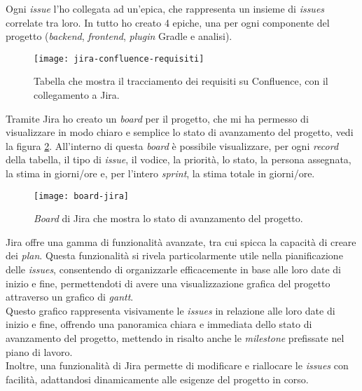 Ogni \textit{issue} l'ho collegata ad un'epica, che rappresenta un insieme di \textit{issues} correlate tra loro. In tutto ho creato 4 epiche,
una per ogni componente del progetto (\textit{backend}, \textit{frontend}, \textit{plugin} Gradle e analisi).\\
\begin{figure}[!h] 
  \centering 
  \texttt{[image: jira-confluence-requisiti]} 
  \caption{Tabella che mostra il tracciamento dei requisiti su Confluence, con il collegamento a Jira.}
  \label{fig:jira-confluence-requisiti}
\end{figure}

Tramite Jira ho creato un \textit{board} per il progetto, che mi ha permesso di visualizzare in modo chiaro e 
semplice lo stato di avanzamento del progetto, vedi la figura \ref*{fig:board-jira}.
All'interno di questa \textit{board} è possibile visualizzare, per ogni \textit{record} della tabella, il tipo di \textit{issue}, il vodice, la priorità, lo stato,
la persona assegnata, la stima in giorni/ore e, per l'intero \textit{sprint}, la stima totale in giorni/ore.\\


\begin{figure}[!h] 
  \centering 
  \texttt{[image: board-jira]} 
  \caption{\textit{Board} di Jira che mostra lo stato di avanzamento del progetto.}
  \label{fig:board-jira}
\end{figure}

Jira offre una gamma di funzionalità avanzate, tra cui spicca la capacità di creare dei \textit{plan}. 
Questa funzionalità si rivela particolarmente utile nella pianificazione delle \textit{issues}, consentendo di organizzarle 
efficacemente in base alle loro date di inizio e fine, permettendoti di avere una visualizzazione grafica del 
progetto attraverso un grafico di \textit{gantt}. \\ Questo grafico rappresenta visivamente le \textit{issues} 
in relazione alle loro date di inizio e fine, offrendo una panoramica chiara e immediata dello stato di avanzamento del progetto, mettendo
in risalto anche le \textit{milestone} prefissate nel piano di lavoro.\\ 
Inoltre, una funzionalità di Jira permette di modificare e riallocare le \textit{issues} con facilità, 
adattandosi dinamicamente alle esigenze del progetto in corso.
